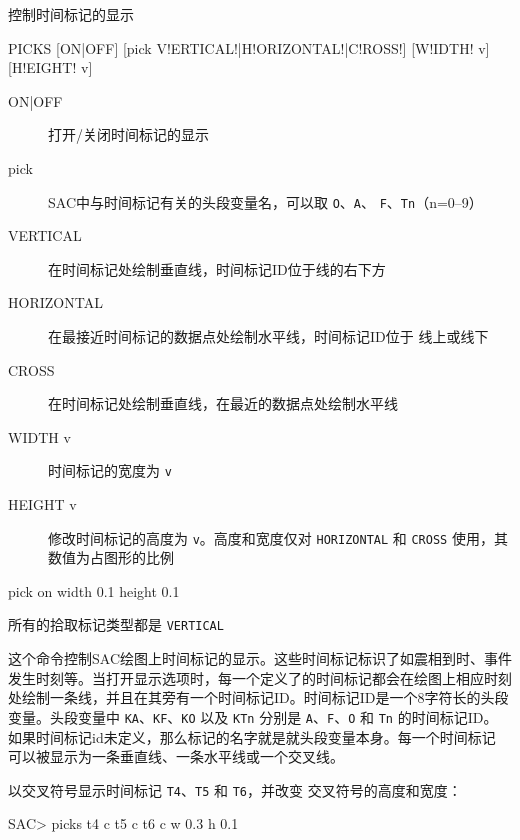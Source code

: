 \label{cmd:picks}

控制时间标记的显示

\begin{SACSTX}
PICKS [ON|OFF] [pick V!ERTICAL!|H!ORIZONTAL!|C!ROSS!] [W!IDTH! v] [H!EIGHT! v]
\end{SACSTX}

\begin{description}
\item [ON|OFF] 打开/关闭时间标记的显示
\item [pick] SAC中与时间标记有关的头段变量名，可以取 \texttt{O}、\texttt{A}、
    \texttt{F}、\texttt{Tn}（n=0--9）
\item [VERTICAL] 在时间标记处绘制垂直线，时间标记ID位于线的右下方
\item [HORIZONTAL] 在最接近时间标记的数据点处绘制水平线，时间标记ID位于
    线上或线下
\item [CROSS] 在时间标记处绘制垂直线，在最近的数据点处绘制水平线
\item [WIDTH v] 时间标记的宽度为 \texttt{v}
\item [HEIGHT v] 修改时间标记的高度为 \texttt{v}。高度和宽度仅对
    \texttt{HORIZONTAL} 和 \texttt{CROSS} 使用，其数值为占图形的比例
\end{description}

\begin{SACDFT}
pick on width 0.1 height 0.1
\end{SACDFT}
所有的拾取标记类型都是 \texttt{VERTICAL}

这个命令控制SAC绘图上时间标记的显示。这些时间标记标识了如震相到时、事件
发生时刻等。当打开显示选项时，每一个定义了的时间标记都会在绘图上相应时刻
处绘制一条线，并且在其旁有一个时间标记ID。时间标记ID是一个8字符长的头段
变量。头段变量中 \texttt{KA}、\texttt{KF}、\texttt{KO} 以及 \texttt{KTn}
分别是 \texttt{A}、\texttt{F}、\texttt{O} 和 \texttt{Tn} 的时间标记ID。
如果时间标记id未定义，那么标记的名字就是就头段变量本身。每一个时间标记
可以被显示为一条垂直线、一条水平线或一个交叉线。

以交叉符号显示时间标记 \texttt{T4}、\texttt{T5} 和 \texttt{T6}，并改变
交叉符号的高度和宽度：
\begin{SACCode}
SAC> picks t4 c t5 c t6 c w 0.3 h 0.1
\end{SACCode}
